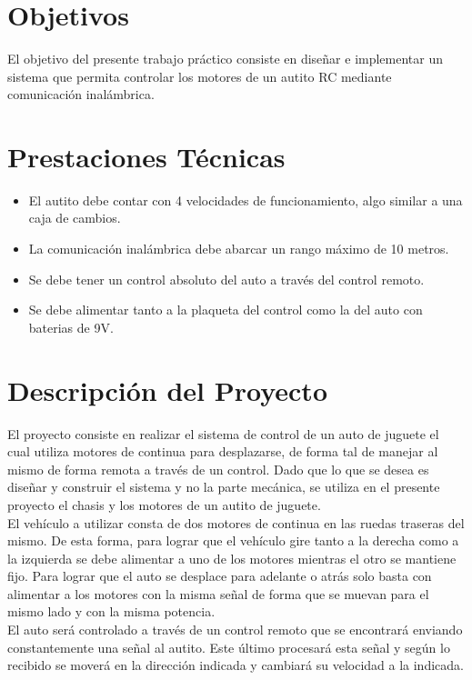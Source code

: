 \documentclass[a4paper,10pt]{article}
\title{  }
\begin{document}
	\maketitle %
	\newpage

	\tableofcontents %
	\newpage

	\section{Objetivos}
		El objetivo del presente trabajo práctico consiste en diseñar e implementar un sistema que permita controlar los motores de un autito RC mediante 
		comunicación inalámbrica. 

	\section{Prestaciones Técnicas}
		\begin{itemize}
			\item El autito debe contar con 4 velocidades de funcionamiento, algo similar a una caja de cambios.
			\item La comunicación inalámbrica debe abarcar un rango máximo de 10 metros. 
			\item Se debe tener un control absoluto del auto a través del control remoto.
			\item Se debe alimentar tanto a la plaqueta del control como la del auto con baterias de 9V.
		\end{itemize} 

	\section{Descripción del Proyecto}
		El proyecto consiste en realizar el sistema de control de un auto de juguete el cual utiliza motores de continua para desplazarse, de forma tal de 
		manejar al mismo de forma remota a través de un control. Dado que lo que se desea es diseñar y construir el sistema y no la parte mecánica, se
		 utiliza en el presente proyecto  el chasis y los motores de un autito de juguete. \\
		\indent El vehículo a utilizar consta de dos motores de continua en las ruedas traseras del mismo. De esta forma, para lograr que el vehículo gire 
		tanto a la derecha como a la izquierda se debe alimentar a uno de los motores mientras el otro se mantiene fijo. Para lograr que el auto se desplace 
		para adelante o atrás solo basta con alimentar a los motores con la misma señal de forma que se muevan para el mismo lado y con la misma 
		potencia. \\
		\indent El auto será controlado a través de un control remoto que se encontrará enviando constantemente una señal al autito. Este último procesará 
		esta señal
		y según lo recibido se moverá en la dirección indicada y cambiará su velocidad a la indicada.
	
\end{document}
